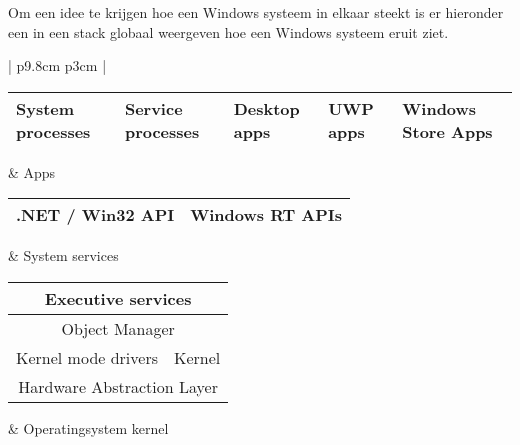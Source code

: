 Om een idee te krijgen hoe een Windows systeem in elkaar steekt is er hieronder een in een stack globaal weergeven hoe een Windows systeem eruit ziet.
\begin{center}
 \begin{tabular}{ | p{9.8cm} p{3cm} | }
 \hline
	    \rule[-2em]{0pt}{4.5em}\begin{tabular}{ | p{1.5cm} | p{1.5cm} | p{1.5cm} |  p{1.5cm} | p{1.5cm} | }
            \hline
		    \cellcolor{orange!25}System processes & \cellcolor{cyan!25}Service processes & \cellcolor{yellow!25}Desktop apps & \cellcolor{green!25}UWP apps & \cellcolor{blue!25}Windows Store Apps \\ 
            \hline
            \end{tabular}
	&
	Apps \\
 \hline
	    \rule[-1.5em]{0pt}{3.5em}\begin{tabular}{ | p{6.5cm} | p{2.3cm} | }
	    \hline
	    \cellcolor{yellow!25}.NET / Win32 API & \cellcolor{blue!25}Windows RT APIs \\ 
            \hline
            \end{tabular}
	&
	System services \\
 \hline
	    \rule[-2.75em]{0pt}{6em}\begin{tabular}{ | p{4.4cm} | p{4.4cm} | }
            \hline
	    \multicolumn{2}{|c|}{\cellcolor{red!25}{}Executive services} \\ 
            \hline
	    \multicolumn{2}{|c|}{\cellcolor{red!25}{}Object Manager} \\ 
            \hline
	    \cellcolor{magenta!25}\hfill Kernel mode drivers \hfill \mbox{} &
	    \cellcolor{olive!25}\hfill Kernel \hfill \mbox{} \\
            \hline
	    \multicolumn{2}{|c|}{\cellcolor{olive!25}{}Hardware Abstraction Layer} \\ 
            \hline
            \end{tabular}
	&
	Operatingsystem kernel \\
 \hline
\end{tabular}
\end{center}

